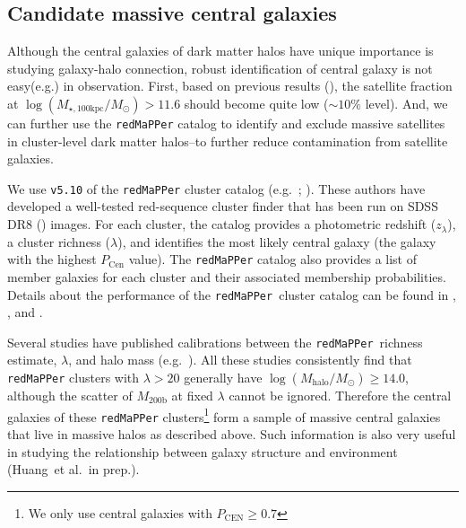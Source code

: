 \documentclass[a4paper,fleqn,usenatbib]{mnras}
\def\etal{{\ et al.~}}
\def\redm{\texttt{redMaPPer}}
\def\mhalo{{$M_{\mathrm{200b}}$}}
\def\logmtot{{$\log (M_{\star,100\mathrm{kpc}}/M_{\odot})$}}
\begin{document}
\subsection{Candidate massive central galaxies}
    \label{ssec:redmapper}
    
    Although the central galaxies of dark matter halos have unique importance is 
    studying galaxy-halo connection, robust identification of central galaxy is 
    not easy(e.g.\citealt{Yang2007}) in observation.
    First, based on previous results (\citealt{Reid2014, Hoshino2015, Saito2016}),
    the satellite fraction at \logmtot{}$> 11.6$ should become quite low 
    ($\sim 10$\% level). 
    And, we can further use the \redm{} catalog to identify and exclude massive 
    satellites in cluster-level dark matter halos--to further reduce contamination
    from satellite galaxies.
    
    We use \texttt{v5.10} of the \redm{} cluster  catalog
    (e.g.\ \citealt{Rykoff2014}; \citealt{Rozo2015b}). 
    These authors have developed a well-tested red-sequence cluster finder that has 
    been run on SDSS DR8 (\citealt{SDSSDR8}) images. 
    For each cluster, the catalog provides a photometric redshift ($z_{\lambda}$), a 
    cluster richness ($\lambda$), and identifies the most likely central galaxy (the 
    galaxy with the highest $P_{\mathrm{Cen}}$ value). 
    The \redm{}{} catalog also provides a list of member galaxies for each cluster and 
    their associated membership probabilities. 
    Details about the performance of the \redm{}~cluster catalog can be found in 
    \citet{Rozo2014}, \citet{Rozo2015a}, and \citet{Rozo2015b}. 
    
    Several studies have published calibrations between the \redm{}~richness estimate, 
    $\lambda$, and halo mass (e.g.\ \citealt{Saro2015, Farahi2016, Simet2016, 
    Melchior2016}). 
    All these studies consistently find that \redm{} clusters with $\lambda > 20$ 
    generally have $\log (M_{\mathrm{halo}}/M_{\odot}) \geq 14.0$, although the scatter 
    of \mhalo{} at fixed $\lambda$ cannot be ignored.
    Therefore the central galaxies of these \redm{} clusters\footnote{We only use 
    central galaxies with $P_{\mathrm{CEN}} \geq 0.7$} form a sample of massive central 
    galaxies that live in massive halos as described above.
    Such information is also very useful in studying the relationship between galaxy
    structure and environment (Huang\etal in prep.).

\end{document}
